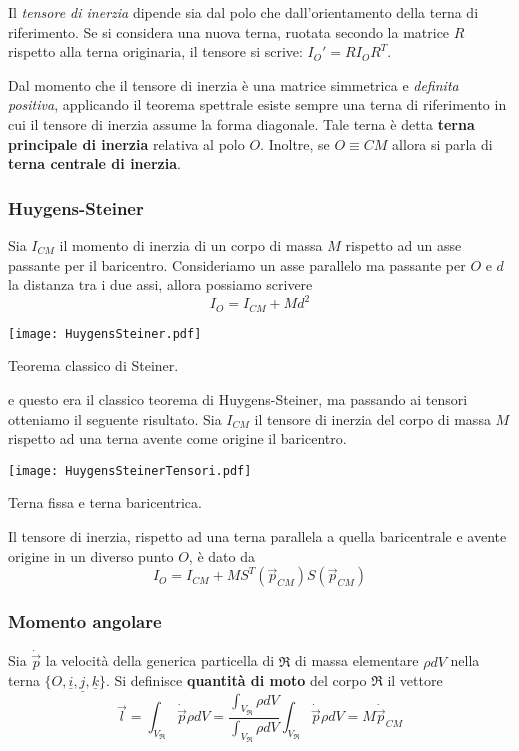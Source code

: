 Il \emph{tensore di inerzia} dipende sia dal polo che dall'orientamento della terna di riferimento. Se si considera una nuova terna, ruotata secondo la matrice $R$ rispetto alla terna originaria, il tensore si scrive: $I_O' = RI_OR^T$.

Dal momento che il tensore di inerzia è una matrice simmetrica e \emph{definita positiva}, applicando il teorema spettrale esiste sempre una terna di riferimento in cui il tensore di inerzia assume la forma diagonale. Tale terna è detta \textbf{terna principale di inerzia} relativa al polo $O$. Inoltre, se $O \equiv CM$ allora si parla di \textbf{terna centrale di inerzia}.

\subsubsection{Huygens-Steiner}
Sia $I_{CM}$ il momento di inerzia di un corpo di massa $M$ rispetto ad un asse passante per il baricentro. Consideriamo un asse parallelo ma passante per $O$ e $d$ la distanza tra i due assi, allora possiamo scrivere
\begin{equation}
	I_O = I_{CM} + Md^2
\end{equation}  
\begin{center}
	\texttt{[image: HuygensSteiner.pdf]}
	\caption{Teorema classico di Steiner.}
\end{center}
e questo era il classico teorema di Huygens-Steiner, ma passando ai tensori otteniamo il seguente risultato. Sia $I_{CM}$ il tensore di inerzia del corpo di massa $M$ rispetto ad una terna avente come origine il baricentro. 
\begin{center}
	\texttt{[image: HuygensSteinerTensori.pdf]}
	\caption{Terna fissa e terna baricentrica.}
\end{center}

Il tensore di inerzia, rispetto ad una terna parallela a quella baricentrale e avente origine in un diverso punto $O$, è dato da
\begin{equation}
	I_O = I_{CM} + M S^T(\vec{p}_{CM})S(\vec{p}_{CM})
\end{equation}


\subsubsection{Momento angolare}
Sia $\dot{\vec{p}}$ la velocità della generica particella di $\mathfrak{R}$ di massa elementare $\rho dV$ nella terna $\lbrace O, \underline{i}, \underline{j}, \underline{k} \rbrace$. Si definisce \textbf{quantità di moto} del corpo $\mathfrak{R}$ il vettore
\begin{equation}
	\vec{l} = \int_{V_{\mathfrak{R}}} \dot{\vec{p}} \rho dV = \frac{\int_{V_{\mathfrak{R}}} \rho dV}{\int_{V_{\mathfrak{R}}} \rho dV} \int_{V_{\mathfrak{R}}} \dot{\vec{p}} \rho dV = M \dot{\vec{p}}_{CM}
\end{equation}

